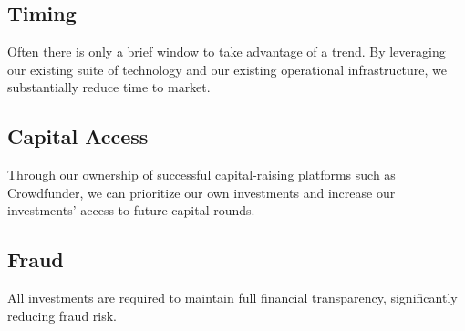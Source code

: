 \documentclass[11pt]{article}
\begin{document}
\subsection{Timing}

Often there is only a brief window to take advantage of a trend. By leveraging our existing suite of technology and our existing operational infrastructure, we substantially reduce time to market.


\subsection{Capital Access}

Through our ownership of successful capital-raising platforms such as Crowdfunder, we can prioritize our own investments and increase our investments' access to future capital rounds.


\subsection{Fraud}

All investments are required to maintain full financial transparency, significantly reducing fraud risk.
\end{document}
